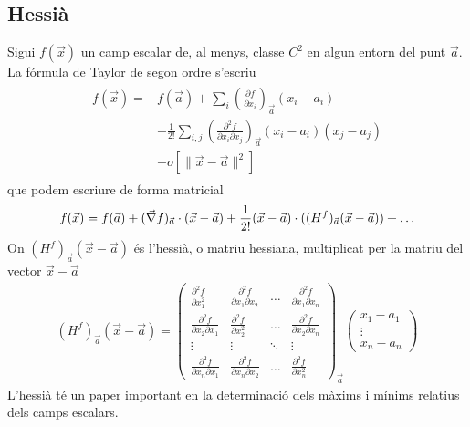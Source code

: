 \subsection{Hessià}
Sigui $f(\vec{x})$ un camp escalar de, al menys, classe $C^{2}$ en algun entorn del punt $\vec{a}$. La fórmula de Taylor de segon ordre s'escriu
\begin{align}
    \begin{aligned}
        f(\vec{x}) = & f(\vec{a}) + \sum_{i} \left( \frac{\partial f}{\partial x_{i}} \right)_{\vec{a}} (x_{i} - a_{i}) \\
        & + \frac{1}{2!} \sum_{i, j} \left( \frac{\partial^{2} f}{\partial x_{i} \partial x_{j}} \right)_{\vec{a}} (x_{i} - a_{i}) (x_{j} - a_{j}) \\
        & + o[\| \vec{x} - \vec{a} \|^{2}]
    \end{aligned}
\end{align}
que podem escriure de forma matricial
\begin{align}
    f(\vec{x}) = f(\vec{a}) + (\vec{\nabla} f)_{\vec{a}} \cdot (\vec{x} - \vec{a}) + \frac{1}{2!} (\vec{x} - \vec{a}) \cdot ((H^{f})_{\vec{a}}(\vec{x} - \vec{a})) + \dots
\end{align}
On $(H^{f})_{\vec{a}}(\vec{x} - \vec{a})$ és l'hessià, o matriu hessiana, multiplicat per la matriu del vector $\vec{x} - \vec{a}$
\begin{align}
    (H^{f})_{\vec{a}}(\vec{x} - \vec{a}) = \begin{pmatrix} \displaystyle \frac{\partial^{2} f}{\partial x_{1}^{2}} & \displaystyle \frac{\partial^{2} f}{\partial x_{1} \partial x_{2}} & \dots & \displaystyle \frac{\partial^{2} f}{\partial x_{1} \partial x_{n}} \\ \displaystyle \frac{\partial^{2} f}{\partial x_{2} \partial x_{1}} & \displaystyle \frac{\partial^{2} f}{\partial x_{2}^{2}} & \dots & \displaystyle \frac{\partial^{2} f}{\partial x_{2} \partial x_{n}} \\ \vdots & \vdots & \ddots & \vdots \\ \displaystyle \frac{\partial^{2} f}{\partial x_{n} \partial x_{1}} & \displaystyle \frac{\partial^{2} f}{\partial x_{n} \partial x_{2}} & \dots & \displaystyle \frac{\partial^{2} f}{\partial x_{n}^{2}} \end{pmatrix}_{\vec{a}} \begin{pmatrix} x_{1} - a_{1} \\ \vdots \\ x_{n} - a_{n} \end{pmatrix}
\end{align}
L'hessià té un paper important en la determinació dels màxims i mínims relatius dels camps escalars.

